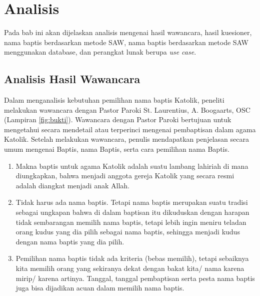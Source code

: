\chapter{Analisis}
\label{chap:analisis}

Pada bab ini akan dijelaskan analisis mengenai hasil wawancara, hasil kuesioner, nama baptis berdasarkan metode SAW, nama baptis berdasarkan metode SAW menggunakan database, dan perangkat lunak berupa \textit{use case}.

\section{Analisis Hasil Wawancara}
\label{sec:analisiswawancara}

Dalam menganalisis kebutuhan pemilihan nama baptis Katolik, peneliti melakukan wawancara dengan Pastor Paroki St. Laurentius, A. Boogaarts, OSC (Lampiran \ref{fig:bukti}). Wawancara dengan Pastor Paroki bertujuan untuk mengetahui secara mendetail atau terperinci mengenai pembaptisan dalam agama Katolik. Setelah melakukan wawancara, penulis mendapatkan penjelasan secara umum mengenai Baptis, nama Baptis, serta cara pemilihan nama Baptis.
\begin{enumerate}
	\item Makna baptis untuk agama Katolik adalah suatu lambang lahiriah di mana diungkapkan, bahwa menjadi anggota gereja Katolik yang secara resmi adalah diangkat menjadi anak Allah.
	\item Tidak harus ada nama baptis. Tetapi nama baptis merupakan suatu tradisi sebagai ungkapan bahwa di dalam baptisan itu dikuduskan dengan harapan tidak sembarangan memilih nama baptis, tetapi lebih ingin meniru teladan orang kudus yang dia pilih sebagai nama baptis, sehingga menjadi kudus dengan nama baptis yang dia pilih.
		\item Pemilihan nama baptis tidak ada kriteria (bebas memilih), tetapi sebaiknya kita memilih orang yang sekiranya dekat dengan bakat kita/ nama karena mirip/ karena artinya. Tanggal, tanggal pembaptisan serta pesta nama baptis juga bisa dijadikan acuan dalam memilih nama baptis.
\end{enumerate}

